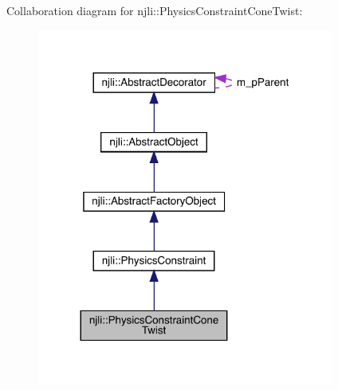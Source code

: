 Collaboration diagram for njli\+:\+:Physics\+Constraint\+Cone\+Twist\+:\nopagebreak
\begin{figure}[H]
\begin{center}
\leavevmode
\includegraphics[width=276pt]{classnjli_1_1_physics_constraint_cone_twist__coll__graph}
\end{center}
\end{figure}
